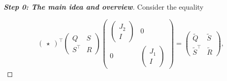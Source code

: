 \documentclass[11pt,a4paper,oneside,DIV=12,headings=small]{scrartcl}
\theoremstyle{plain}
\begin{document}
\begin{proof}[\textbf{Step 0: \textit{The main idea and overview}}]
Consider the equality

\begin{equation}
\label{S1}
\begin{pmatrix} \star \end{pmatrix}^\top
\begin{pmatrix} Q & S \\ S^\top & R \end{pmatrix}
\begin{pmatrix} \begin{pmatrix} J_2 \\ I \end{pmatrix} & 0 \\ 
0 & \begin{pmatrix} J_1 \\ I \end{pmatrix} \end{pmatrix}
 = \begin{pmatrix} \tilde{Q} & \tilde{S} \\ \tilde{S}^\top & \tilde{R} \end{pmatrix},
\end{equation}


\end{proof}
\end{document}
